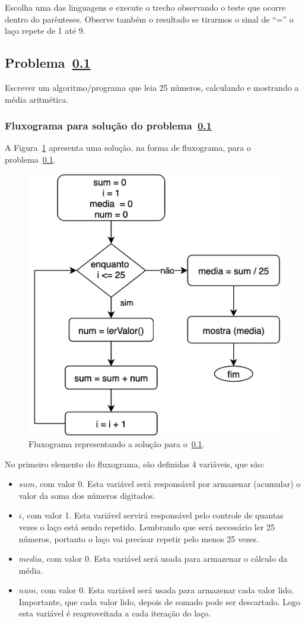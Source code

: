 Escolha uma das linguagens e execute o trecho observando o teste que ocorre dentro do parênteses. Observe também o resultado se tirarmos o sinal de “=” o laço repete de 1 até 9.


\subsection{Problema~\ref{problema(while2)}}
\label{problema(while2)}
Escrever um algoritmo/programa que leia 25 números, calculando e mostrando a média aritmética.

\subsubsection*{Fluxograma para solução do problema~\ref{problema(while2)}}
A Figura~\ref{fig:problema2} apresenta uma solução, na forma de fluxograma, para o problema~\ref{problema(while2)}.

\begin{figure}[h]
  \begin{center}
    \includegraphics[width=0.5\linewidth]{img/problemaWhile2.png}
    \caption{Fluxograma representando a solução para o~\ref{problema(while2)}.}
    \label{fig:problema2}
  \end{center}
\end{figure}

No primeiro elemento do fluxograma, são definidas 4 variáveis, que são: 
\begin{itemize}
  \item $sum$, com valor 0. Esta variável será responsável por armazenar (acumular) o valor da soma dos números digitados.
  \item $i$, com valor 1. Esta variável servirá responsável pelo controle de quantas vezes o laço está sendo repetido. Lembrando que será necessário ler 25 números, portanto o laço vai precisar repetir pelo menos 25 vezes.
  \item $media$, com valor 0. Esta variável será usada para armazenar o cálculo da média.
  \item $num$, com valor 0. Esta variável será usada para armazenar cada valor lido. Importante, que cada valor lido, depois de somado pode ser descartado. Logo esta variável é reaproveitada a cada iteração do laço.
\end{itemize}

